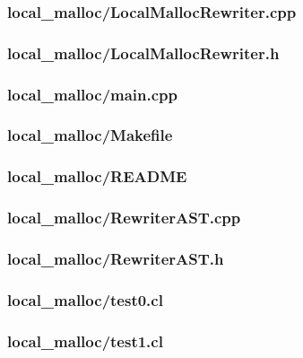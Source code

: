 \documentclass{article}
\begin{document}
\subsubsection*{local\_malloc/LocalMallocRewriter.cpp}


\subsubsection*{local\_malloc/LocalMallocRewriter.h}


\subsubsection*{local\_malloc/main.cpp}


\subsubsection*{local\_malloc/Makefile}


\subsubsection*{local\_malloc/README}


\subsubsection*{local\_malloc/RewriterAST.cpp}


\subsubsection*{local\_malloc/RewriterAST.h}


\subsubsection*{local\_malloc/test0.cl}


\subsubsection*{local\_malloc/test1.cl}

\end{document}
